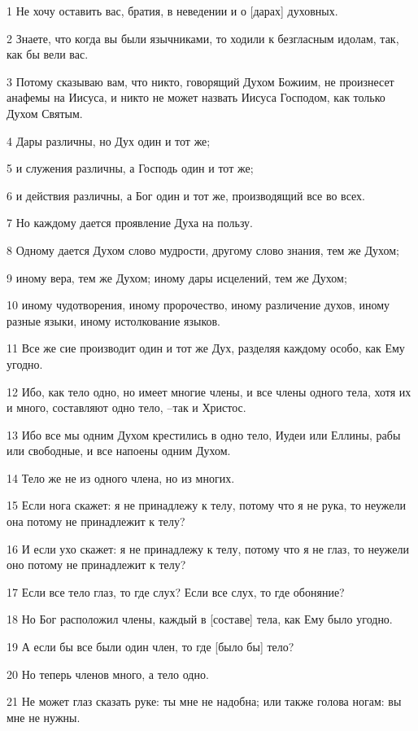 \par 1 Не хочу оставить вас, братия, в неведении и о [дарах] духовных.
\par 2 Знаете, что когда вы были язычниками, то ходили к безгласным идолам, так, как бы вели вас.
\par 3 Потому сказываю вам, что никто, говорящий Духом Божиим, не произнесет анафемы на Иисуса, и никто не может назвать Иисуса Господом, как только Духом Святым.
\par 4 Дары различны, но Дух один и тот же;
\par 5 и служения различны, а Господь один и тот же;
\par 6 и действия различны, а Бог один и тот же, производящий все во всех.
\par 7 Но каждому дается проявление Духа на пользу.
\par 8 Одному дается Духом слово мудрости, другому слово знания, тем же Духом;
\par 9 иному вера, тем же Духом; иному дары исцелений, тем же Духом;
\par 10 иному чудотворения, иному пророчество, иному различение духов, иному разные языки, иному истолкование языков.
\par 11 Все же сие производит один и тот же Дух, разделяя каждому особо, как Ему угодно.
\par 12 Ибо, как тело одно, но имеет многие члены, и все члены одного тела, хотя их и много, составляют одно тело, --так и Христос.
\par 13 Ибо все мы одним Духом крестились в одно тело, Иудеи или Еллины, рабы или свободные, и все напоены одним Духом.
\par 14 Тело же не из одного члена, но из многих.
\par 15 Если нога скажет: я не принадлежу к телу, потому что я не рука, то неужели она потому не принадлежит к телу?
\par 16 И если ухо скажет: я не принадлежу к телу, потому что я не глаз, то неужели оно потому не принадлежит к телу?
\par 17 Если все тело глаз, то где слух? Если все слух, то где обоняние?
\par 18 Но Бог расположил члены, каждый в [составе] тела, как Ему было угодно.
\par 19 А если бы все были один член, то где [было бы] тело?
\par 20 Но теперь членов много, а тело одно.
\par 21 Не может глаз сказать руке: ты мне не надобна; или также голова ногам: вы мне не нужны.
